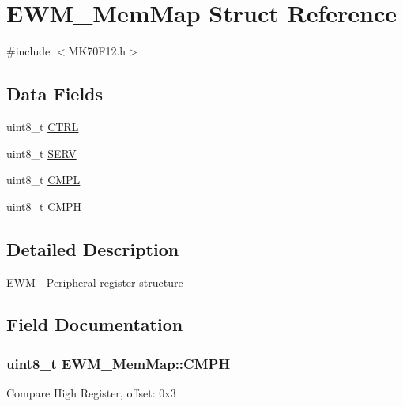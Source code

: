 \hypertarget{struct_e_w_m___mem_map}{}\section{E\+W\+M\+\_\+\+Mem\+Map Struct Reference}
\label{struct_e_w_m___mem_map}


{\ttfamily \#include $<$M\+K70\+F12.\+h$>$}

\subsection*{Data Fields}
\begin{DoxyCompactItemize}
\item 
uint8\+\_\+t \hyperlink{struct_e_w_m___mem_map_a033a88d44ad1daa23ce3deb13bc94811}{C\+T\+R\+L}
\item 
uint8\+\_\+t \hyperlink{struct_e_w_m___mem_map_aa9c25d4775f785d6911e096a226f4e40}{S\+E\+R\+V}
\item 
uint8\+\_\+t \hyperlink{struct_e_w_m___mem_map_ada0221f7554297f23a0257f54f28f5fc}{C\+M\+P\+L}
\item 
uint8\+\_\+t \hyperlink{struct_e_w_m___mem_map_a88293412bcc664b463f1fef25312c4ab}{C\+M\+P\+H}
\end{DoxyCompactItemize}


\subsection{Detailed Description}
E\+W\+M -\/ Peripheral register structure 

\subsection{Field Documentation}
\hypertarget{struct_e_w_m___mem_map_a88293412bcc664b463f1fef25312c4ab}{}
\subsubsection[{C\+M\+P\+H}]{\setlength{\rightskip}{0pt plus 5cm}uint8\+\_\+t E\+W\+M\+\_\+\+Mem\+Map\+::\+C\+M\+P\+H}\label{struct_e_w_m___mem_map_a88293412bcc664b463f1fef25312c4ab}
Compare High Register, offset\+: 0x3 \hypertarget{struct_e_w_m___mem_map_ada0221f7554297f23a0257f54f28f5fc}{}

